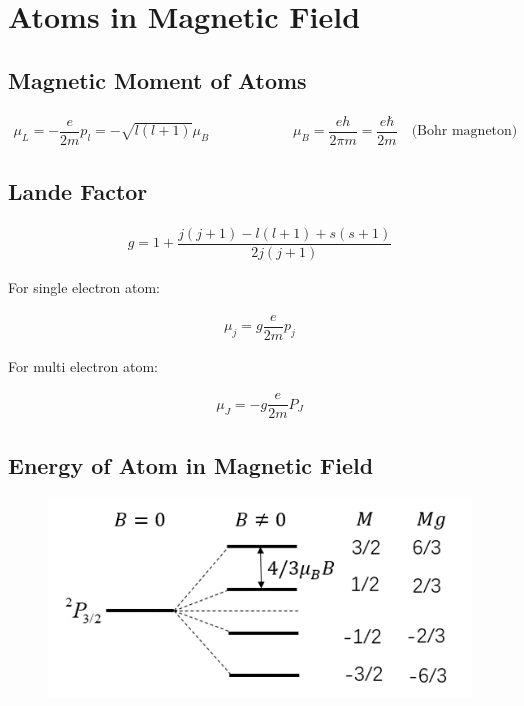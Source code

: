 \chapter{Atoms in Magnetic Field}

\section{Magnetic Moment of Atoms}

\begin{equation*}
  \begin{aligned}
    \mu_L = - \dfrac{e}{2m}p_l = - \sqrt{l \left( l + 1 \right)} \mu_B
    \quad\quad
    \quad\quad
    \quad\quad
    \mu_B = \dfrac{e h}{2 \pi m} = \dfrac{e\hbar}{2m}   
    \quad
    \text{(Bohr magneton)}
  \end{aligned}
\end{equation*}

\section{Lande Factor}

\begin{equation*}
  \begin{aligned}
    g = 1 + \dfrac{j \left( j + 1 \right) - l \left( l + 1 \right) + s \left( s + 1 \right)}{2 j \left( j + 1 \right)} 
  \end{aligned}
\end{equation*}

For single electron atom:

\begin{equation*}
  \begin{aligned}
    \mu_j = g \dfrac{e}{2m} p_j 
  \end{aligned}
\end{equation*}

For multi electron atom:

\begin{equation*}
  \begin{aligned}
    \mu_J = - g \dfrac{e}{2m} P_J 
  \end{aligned}
\end{equation*}

\section{Energy of Atom in Magnetic Field}

\begin{figure}[H]
  \centering
  \includegraphics[width=0.7\linewidth]{figures/energy-magnetic.png}
\end{figure}

